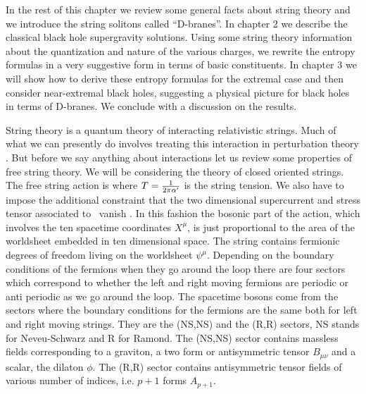 In the rest of this chapter we 
review  some general facts
about string theory and we  introduce the 
string solitons called ``D-branes''.
In chapter 2  we  
describe the classical black hole supergravity solutions.
Using some string theory information about 
the quantization and nature of the various
charges, we rewrite
the entropy formulas in a very
suggestive form  in terms of basic constituents.
In chapter 3  we will show how to derive these
entropy formulas for the extremal case and  then
consider near-extremal black holes,
suggesting a physical picture for black holes
in terms of D-branes.
We conclude with a discussion on the results. 









String theory is a quantum theory of interacting relativistic
strings. Much of what we can presently do involves   treating  
this interaction in perturbation theory \REV . 
But before we say anything about interactions let us review some
properties of free string theory. 
We will  be considering the theory of closed oriented strings.
The free string action is
\eqn{}
where $ T = { 1 \over 2 \pi \alpha' } $ is the string tension.
We also have to impose the additional constraint that the two
dimensional supercurrent and stress tensor associated to \actionstr\
vanish \GSW . In this fashion 
the  bosonic part of the action, which involves the ten 
spacetime coordinates $X^\mu$, 
is just proportional to the area of the worldsheet embedded in 
ten dimensional space. The 
string contains  fermionic degrees of freedom living
on the worldsheet $\psi^\mu$.
Depending on the   boundary conditions
 of the fermions when they 
go around the loop there are four sectors which correspond
to whether the left and right moving fermions are periodic
or anti periodic as we go around the loop. 
The spacetime 
bosons come from the sectors where the boundary conditions
for the fermions are the same both for left and right moving
strings. They are the (NS,NS) and the (R,R) sectors, NS stands
for Neveu-Schwarz and R for Ramond. 
The  (NS,NS)  sector contains massless fields corresponding
to a graviton, a two form or antisymmetric tensor $B_{\mu\nu}$ and
a scalar, the dilaton $\phi$. The (R,R) sector contains antisymmetric
tensor fields of various number of indices, i.e.  $p+1$ 
 forms $A_{p+1}$.

